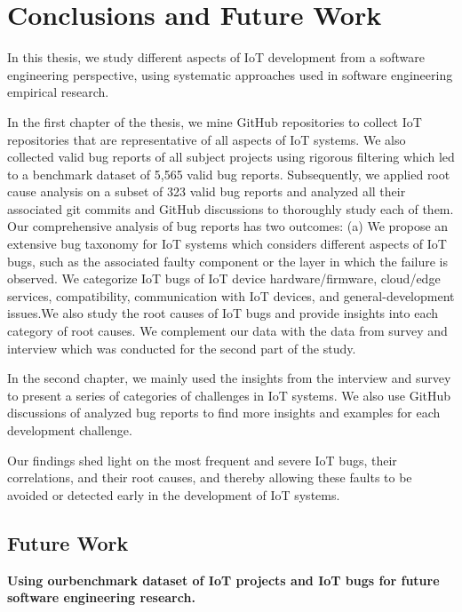 
\chapter{Conclusions and Future Work}
\label{ch:conclusion}

In this thesis, we study different aspects of IoT development from a software engineering perspective, using systematic approaches used in software engineering empirical research. 

In the first chapter of the thesis, we mine GitHub repositories to collect IoT repositories that are representative of all aspects of IoT systems. We also collected valid bug reports of all subject projects using rigorous filtering which led to a benchmark dataset of 5,565 valid bug reports. Subsequently, we applied root cause analysis on a subset of 323 valid bug reports and analyzed all their associated git commits and GitHub discussions to thoroughly study each of them. Our comprehensive analysis of bug reports has two outcomes: (a) We propose an extensive bug taxonomy for IoT systems which considers different aspects of IoT bugs, such as the associated faulty component or the layer in which the failure is observed. We categorize IoT bugs of IoT device hardware/firmware, cloud/edge services, compatibility, communication with IoT devices, and general-development issues.We also study the root causes of IoT bugs and provide insights into each category of root causes. We complement our data with the data from survey and interview which was conducted for the second part of the study.

In the second chapter, we mainly used the insights from the interview and survey to present a series of categories of challenges in IoT systems. We also use GitHub discussions of analyzed bug reports to find more insights and examples for each development challenge.

Our findings shed light on the most frequent and severe IoT bugs, their correlations, and their root causes, and thereby allowing these faults to be avoided or detected early in the development of IoT systems. 

\section{Future Work}

 \textbf{Using ourbenchmark dataset of IoT projects and IoT bugs for future software engineering research.}

